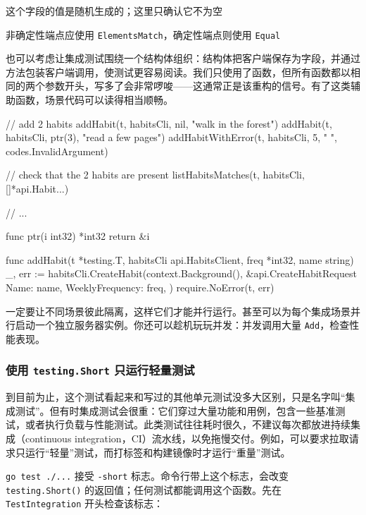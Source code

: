 \begin{codeannotations}
\item 这个字段的值是随机生成的；这里只确认它不为空
\item 非确定性端点应使用 \texttt{ElementsMatch}，确定性端点则使用 \texttt{Equal}
\end{codeannotations}

也可以考虑让集成测试围绕一个结构体组织：结构体把客户端保存为字段，并通过方法包装客户端调用，使测试更容易阅读。我们只使用了函数，但所有函数都以相同的两个参数开头，写多了会非常啰唆——这通常正是该重构的信号。有了这类辅助函数，场景代码可以读得相当顺畅。

\begin{gocode}[title={代码清单 10.29 \texttt{integration\_test.go}：用代码表达场景}]
// add 2 habits
addHabit(t, habitsCli, nil, "walk in the forest")
addHabit(t, habitsCli, ptr(3), "read a few pages")
addHabitWithError(t, habitsCli, 5, "        ", codes.InvalidArgument)

// check that the 2 habits are present
listHabitsMatches(t, habitsCli, []*api.Habit{...})

// ...

func ptr(i int32) *int32 {
    return &i
}

func addHabit(t *testing.T, habitsCli api.HabitsClient,
    freq *int32, name string) {
    _, err := habitsCli.CreateHabit(context.Background(),
        &api.CreateHabitRequest{
            Name:            name,
            WeeklyFrequency: freq,
        })
    require.NoError(t, err)
}
\end{gocode}

一定要让不同场景彼此隔离，这样它们才能并行运行。甚至可以为每个集成场景并行启动一个独立服务器实例。你还可以趁机玩玩并发：并发调用大量 \texttt{Add}，检查性能表现。

\subsubsection{使用 \texttt{testing.Short} 只运行轻量测试}

到目前为止，这个测试看起来和写过的其他单元测试没多大区别，只是名字叫“集成测试”。但有时集成测试会很重：它们穿过大量功能和用例，包含一些基准测试，或者执行负载与性能测试。此类测试往往耗时很久，不建议每次都放进持续集成（continuous integration，CI）流水线，以免拖慢交付。例如，可以要求拉取请求只运行“轻量”测试，而打标签和构建镜像时才运行“重量”测试。

\texttt{go test ./...} 接受 \texttt{-short} 标志。命令行带上这个标志，会改变 \texttt{testing.Short()} 的返回值；任何测试都能调用这个函数。先在 \texttt{TestIntegration} 开头检查该标志：

